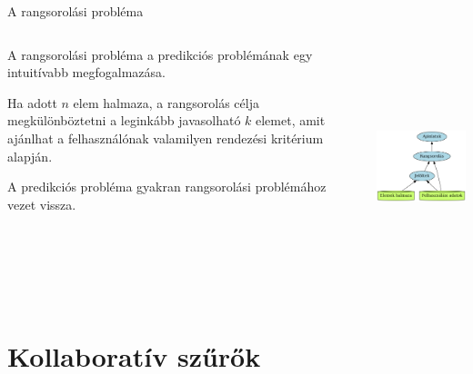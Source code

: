\documentclass[english, aspectratio=169]{beamer}
\makeatletter
\let\origtableofcontents=\tableofcontents
\def\tableofcontents{\@ifnextchar[{\origtableofcontents}{\gobbletableofcontents}}
\def\gobbletableofcontents#1{\origtableofcontents}
\makeatother
\begin{document}
\begin{frame}{A rangsorolási probléma}
\begin{columns}
\begin{column}{.5\textwidth}
A rangsorolási probléma a predikciós problémának egy intuitívabb megfogalmazása.\par\smallskip
Ha adott $n$ elem halmaza, a rangsorolás célja megkülönböztetni a leginkább javasolható $k$ elemet, amit ajánlhat a felhasználónak valamilyen rendezési kritérium alapján.\par\smallskip
A predikciós probléma gyakran rangsorolási problémához vezet vissza.
\end{column}
\begin{column}{.5\textwidth}
\begin{center}
\includegraphics[width=7cm, height=7cm, keepaspectratio]{graphs/recommender_3.png}
\end{center}
\end{column}
\end{columns}
\end{frame}

\section{Kollaboratív szűrők}

\begin{frame}
\tableofcontents[currentsection]
\end{frame}
\end{document}
